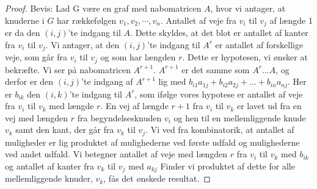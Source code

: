 \begin{proof}
Bevis: Lad G være en graf med nabomatricen 
\textbf{$A$}, hvor vi antager, at knuderne i $G$ har rækkefølgen $v_{1},v_{2},\cdots,v_{n}$. Antallet af veje fra $v_{i}$ til $v_{j}$ af længde 1 er da den $(i,j)$'te indgang til 
\textbf{$A$}. Dette skyldes, at det blot er antallet af kanter fra $v_{i}$ til $v_{j}$.
Vi antager, at den $(i,j)$'te indgang til 
\textbf{${A^r}$} er antallet af forskellige veje, som går fra $v_{i}$ til $v_{j}$ og som har længden $r$. Dette er hypotesen, vi ønsker at bekræfte.
Vi ser på nabomatricen \textbf{$A^{r+1}$}. 
\textbf{$A^{r+1}$} er det samme som 
\textbf{$A^{r}$}$\dotsc$\textbf{$A$}, og derfor er den $(i,j)$'te indgang af \textbf{$A^{r+1}$} lig med $b_{i1}a_{1j} + b_{i2}a_{2j} +\dotsc+ b_{in}a_{nj}$. Her er $b_{ik}$  den $(i,k)$'te indgang til 
\textbf{$A^{r}$}, som ifølge vores hypotese er antallet af veje fra $v_{i}$ til $v_{k}$ med længde $r$.
En vej af længde $r + 1$ fra $v_{i}$ til $v_{k}$ er lavet ud fra en vej med længden $r$ fra begyndelsesknuden $v_{i}$ og hen til en mellemliggende knude $v_{k}$ samt den kant, der går fra $v_{k}$ til $v_{j}$. Vi ved fra kombinatorik, at antallet af muligheder er lig produktet af mulighederne ved første udfald og mulighederne ved andet udfald. Vi betegner antallet af veje med længden $r$ fra $v_{i}$ til $v_{k}$ med $b_{ik}$ og antallet af kanter fra $v_{k}$ til $v_{j}$ med $a_{kj}$ Finder vi produktet af dette for alle mellemliggende knuder, $v_{k}$, fås det ønskede resultat.
\end{proof}

